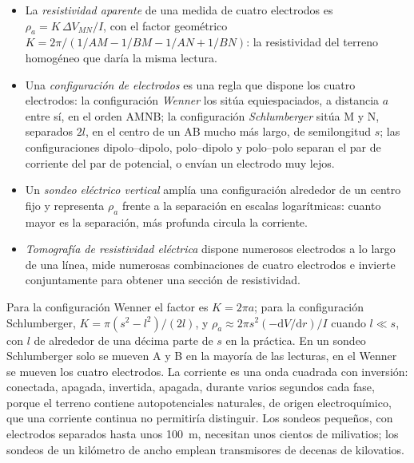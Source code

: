 \begin{definition}\label{def:b3:field-lab-methods-3:resistivity}
\leavevmode
\begin{itemize}
  \item La \emph{resistividad aparente} de una
        medida de cuatro electrodos es $\rho_a = K\,\Delta V_{MN}/I$, con
        el factor geométrico $K = 2\pi/(1/AM - 1/BM - 1/AN + 1/BN)$: la
        resistividad del terreno homogéneo que daría la misma
        lectura.
  \item Una \emph{configuración de electrodos} es una regla que
        dispone los cuatro electrodos: la configuración \emph{Wenner} los sitúa
        equiespaciados, a distancia $a$ entre sí, en el orden AMNB; la
        configuración \emph{Schlumberger} sitúa M y N, separados $2l$, en el centro
        de un AB mucho más largo, de semilongitud $s$; las configuraciones dipolo--dipolo,
        polo--dipolo y polo--polo separan el par de corriente
        del par de potencial, o envían un electrodo muy lejos.
  \item Un \emph{sondeo eléctrico vertical}
        amplía una configuración alrededor de un centro fijo y representa
        $\rho_a$ frente a la separación en escalas logarítmicas: cuanto mayor
        es la separación, más profunda circula la corriente.
  \item \emph{Tomografía de resistividad eléctrica}
        dispone numerosos electrodos a lo largo de una línea,
        mide numerosas combinaciones de cuatro electrodos e invierte
        conjuntamente para obtener una sección de resistividad.
\end{itemize}
\end{definition}

Para la configuración Wenner el factor es $K = 2\pi a$; para la
configuración Schlumberger, $K = \pi(s^2 - l^2)/(2l)$, y $\rho_a \approx 2\pi s^2(-\mathrm{d}V/
\mathrm{d}r)/I$ cuando $l \ll s$, con $l$ de alrededor de una décima parte de $s$ en
la práctica. En un sondeo Schlumberger solo se mueven A y B en la mayoría de las lecturas,
en el Wenner se mueven los cuatro electrodos. La corriente es una onda
cuadrada con inversión: conectada, apagada, invertida, apagada, durante varios segundos cada fase, porque
el terreno contiene autopotenciales naturales, de origen electroquímico,
que una corriente continua no permitiría distinguir. Los sondeos pequeños, con
electrodos separados hasta unos \qty{100}{m}, necesitan unos cientos de
milivatios; los sondeos de un kilómetro de ancho emplean transmisores de decenas de
kilovatios.

